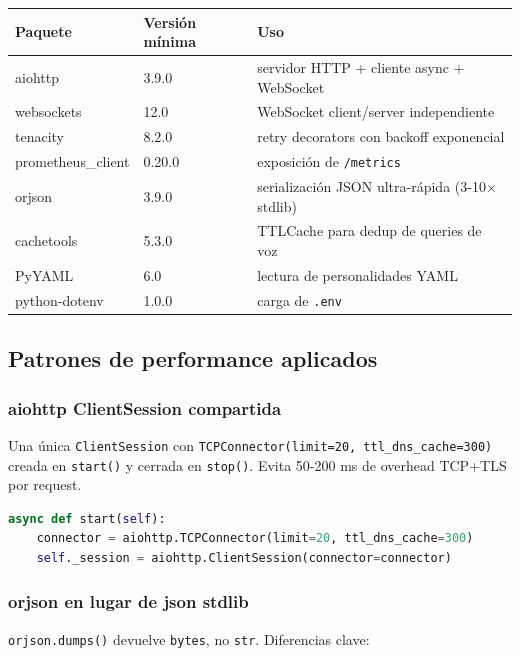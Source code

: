 \documentclass[11pt,a4paper]{article}
\begin{document}
\begin{center}
\begin{tabular}{|l|l|l|}
\hline
\rowcolor{hermesblue}\color{white}\textbf{Paquete} & \color{white}\textbf{Versión mínima} & \color{white}\textbf{Uso}\\
\hline
aiohttp & 3.9.0 & servidor HTTP + cliente async + WebSocket\\
websockets & 12.0 & WebSocket client/server independiente\\
tenacity & 8.2.0 & retry decorators con backoff exponencial\\
prometheus\_client & 0.20.0 & exposición de \texttt{/metrics}\\
orjson & 3.9.0 & serialización JSON ultra-rápida (3-10× stdlib)\\
cachetools & 5.3.0 & TTLCache para dedup de queries de voz\\
PyYAML & 6.0 & lectura de personalidades YAML\\
python-dotenv & 1.0.0 & carga de \texttt{.env}\\
\hline
\end{tabular}
\end{center}

\subsection{Patrones de performance aplicados}

\subsubsection{aiohttp ClientSession compartida}

Una única \texttt{ClientSession} con \texttt{TCPConnector(limit=20, ttl\_dns\_cache=300)} creada en \texttt{start()} y cerrada en \texttt{stop()}. Evita 50-200 ms de overhead TCP+TLS por request.

\begin{lstlisting}[language=Python]
async def start(self):
    connector = aiohttp.TCPConnector(limit=20, ttl_dns_cache=300)
    self._session = aiohttp.ClientSession(connector=connector)
\end{lstlisting}

\subsubsection{orjson en lugar de json stdlib}

\texttt{orjson.dumps()} devuelve \texttt{bytes}, no \texttt{str}. Diferencias clave:
\end{document}
